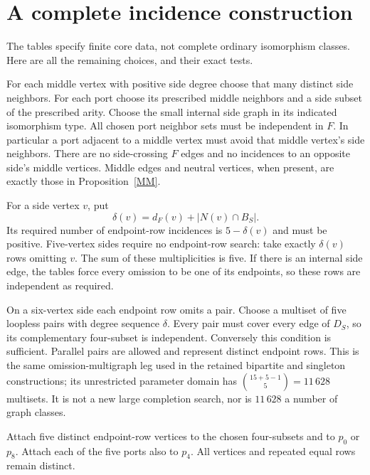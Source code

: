 \documentclass[11pt]{article}
\begin{document}
\section{A complete incidence construction}

The tables specify finite core data, not complete ordinary isomorphism
classes. Here are all the remaining choices, and their exact tests.

For each middle vertex with positive side degree choose that many
distinct side neighbors. For each port choose its prescribed middle
neighbors and a side subset of the prescribed arity. Choose the small
internal side graph in its indicated isomorphism type. All chosen port
neighbor sets must be independent in $F$. In particular a port adjacent
to a middle vertex must avoid that middle vertex's side neighbors.
There are no side-crossing $F$ edges and no incidences to an opposite
side's middle vertices. Middle edges and neutral vertices, when present,
are exactly those in Proposition~\ref{MM}.

For a side vertex $v$, put
\[
 \delta(v)=d_F(v)+|N(v)\cap B_S|.
\]
Its required number of endpoint-row incidences is $5-\delta(v)$ and
must be positive. Five-vertex sides require no endpoint-row search:
take exactly $\delta(v)$ rows omitting $v$. The sum of these
multiplicities is five. If there is an internal side edge, the tables
force every omission to be one of its endpoints, so these rows are
independent as required.

On a six-vertex side each endpoint row omits a pair. Choose a multiset
of five loopless pairs with degree sequence $\delta$. Every pair must
cover every edge of $D_S$, so its complementary four-subset is
independent. Conversely this condition is sufficient. Parallel pairs
are allowed and represent distinct endpoint rows. This is the same
omission-multigraph leg used in the retained bipartite and singleton
constructions; its unrestricted parameter domain has
$\binom{15+5-1}{5}=11\,628$ multisets. It is not a new large completion
search, nor is $11\,628$ a number of graph classes.

Attach five distinct endpoint-row vertices to the chosen four-subsets
and to $p_0$ or $p_8$. Attach each of the five ports also to $p_4$.
All vertices and repeated equal rows remain distinct.
\end{document}
